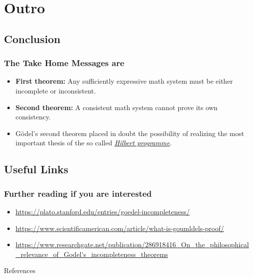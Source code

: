\documentclass[aspectratio=169]{beamer}
\begin{document}
\section{Outro}
\subsection{Conclusion}
\begin{frame}
	\frametitle{The Take Home Messages are}
	\begin{itemize}
		\item \textbf{First theorem:} Any sufficiently expressive math system must be either incomplete or inconsistent.
		\item \textbf{Second theorem:} A consistent math system cannot prove its own consistency.
		\item Gödel's second theorem placed in doubt the possibility of realizing the most important thesis of the so called \href{https://en.wikipedia.org/wiki/Hilbert\%27s_problems}{\textit{Hilbert programme}}. \cite{bekl}
	\end{itemize}
\end{frame}

\subsection{Useful Links}
\begin{frame}
	\frametitle{Further reading if you are interested}
	\begin{itemize}
		\item \url{https://plato.stanford.edu/entries/goedel-incompleteness/}
		\item \url{https://www.scientificamerican.com/article/what-is-goumldels-proof/}
		\item \url{https://www.researchgate.net/publication/286918416_On_the_philosophical_relevance_of_Godel's_incompleteness_theorems}
	\end{itemize}

\end{frame}
\begin{frame}{References}
    
    
\end{frame}
\end{document}
